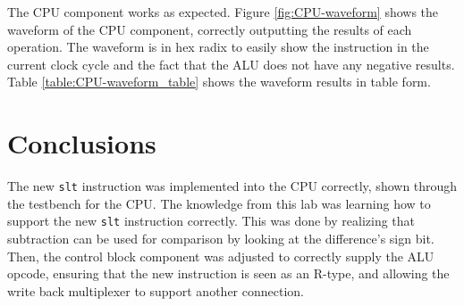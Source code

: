 \documentclass[11pt]{report}
\begin{document}
The CPU component works as expected. Figure \ref{fig:CPU-waveform} shows the waveform of the CPU
component, correctly outputting the results of each operation. The waveform is in hex radix to
easily show the instruction in the current clock cycle and the fact that the ALU does not have any
negative results. Table \ref{table:CPU-waveform_table} shows the waveform results in table form.

\section*{Conclusions}
The new \verb|slt| instruction was implemented into the CPU correctly, shown through the testbench
for the CPU. The knowledge from this lab was learning how to support the new \verb|slt| instruction
correctly. This was done by realizing that subtraction can be used for comparison by looking at the
difference's sign bit. Then, the control block component was adjusted to correctly supply the ALU
opcode, ensuring that the new instruction is seen as an R-type, and allowing the write back
multiplexer to support another connection.

% 
% 
% 
% 
% 
% 
\end{document}
